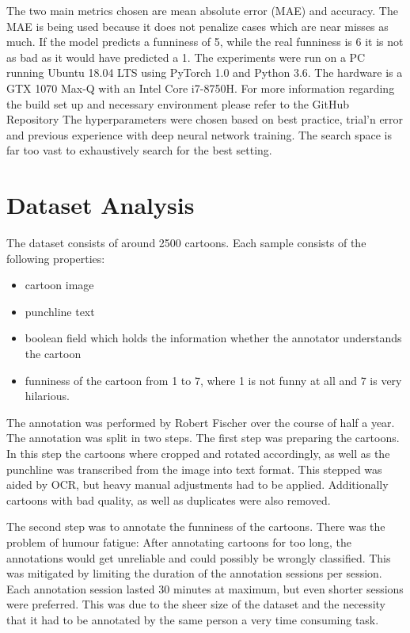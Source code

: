 \documentclass[draft,final,oneside]{vutinfth} %
\begin{document}
The two main metrics chosen are mean absolute error (MAE) and accuracy. The MAE
is being used because it does not penalize cases which are near misses as much. If the
model predicts a funniness of 5, while the real funniness is 6 it is not as bad as it would
have predicted a 1.
The experiments were run on a PC running Ubuntu 18.04 LTS using PyTorch 1.0 and
Python 3.6. The hardware is a GTX 1070 Max-Q with an Intel Core i7-8750H. For more
information regarding the build set up and necessary environment please refer to the
GitHub Repository
The hyperparameters were chosen based on best practice, trial’n error and previous
experience with deep neural network training. The search space is far too vast to
exhaustively search for the best setting.

\section{Dataset Analysis}
The dataset consists of around 2500 cartoons. Each sample consists of the following properties:
\begin{itemize}
\item cartoon image
\item punchline text
\item boolean field which holds the information whether the annotator understands the cartoon
\item funniness of the cartoon from 1 to 7, where 1 is not funny at all and 7 is very hilarious.
\end{itemize}

The annotation was performed by Robert Fischer over the course of half a year. The annotation was split in two steps. The first step was preparing the cartoons. In this step the cartoons where cropped and rotated accordingly, as well as the punchline was transcribed from the image into text format. This stepped was aided by OCR, but heavy manual adjustments had to be applied. Additionally cartoons with bad quality, as well as duplicates were also removed.

The second step was to annotate the funniness of the cartoons. There was the problem of humour fatigue: After annotating cartoons for too long, the annotations would get unreliable and could possibly be wrongly classified. This was mitigated by limiting the duration of the annotation sessions per session. Each annotation session lasted 30 minutes at maximum, but even shorter sessions were preferred. This was due to the sheer size of the dataset and the necessity that it had to be annotated by the same person a very time consuming task.
\end{document}
